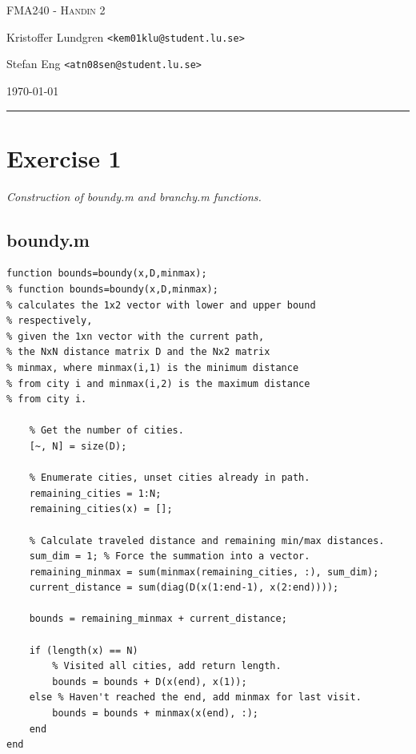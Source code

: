 \documentclass{article}
\begin{document}


\begin{centering}
	{\scshape\Large FMA240 - Handin 2\par}
	\vspace{0.5cm}
	Kristoffer Lundgren \texttt{<kem01klu@student.lu.se>}\par
	Stefan Eng \texttt{<atn08sen@student.lu.se>}\par
    \vspace{0.5cm}
	\today\par
    \rule{\textwidth}{0.4pt}
\end{centering}

\section*{Exercise 1}
  \noindent
  \textit{Construction of boundy.m and branchy.m functions.}

  \subsection*{boundy.m}

  \begin{lstlisting}
function bounds=boundy(x,D,minmax);
% function bounds=boundy(x,D,minmax);
% calculates the 1x2 vector with lower and upper bound
% respectively,
% given the 1xn vector with the current path,
% the NxN distance matrix D and the Nx2 matrix
% minmax, where minmax(i,1) is the minimum distance
% from city i and minmax(i,2) is the maximum distance
% from city i.

    % Get the number of cities.
    [~, N] = size(D);

    % Enumerate cities, unset cities already in path.
    remaining_cities = 1:N;
    remaining_cities(x) = [];

    % Calculate traveled distance and remaining min/max distances.
    sum_dim = 1; % Force the summation into a vector.
    remaining_minmax = sum(minmax(remaining_cities, :), sum_dim);
    current_distance = sum(diag(D(x(1:end-1), x(2:end))));

    bounds = remaining_minmax + current_distance;

    if (length(x) == N)
        % Visited all cities, add return length.
        bounds = bounds + D(x(end), x(1));
    else % Haven't reached the end, add minmax for last visit.
        bounds = bounds + minmax(x(end), :);
    end
end
  \end{lstlisting}
\end{document}
